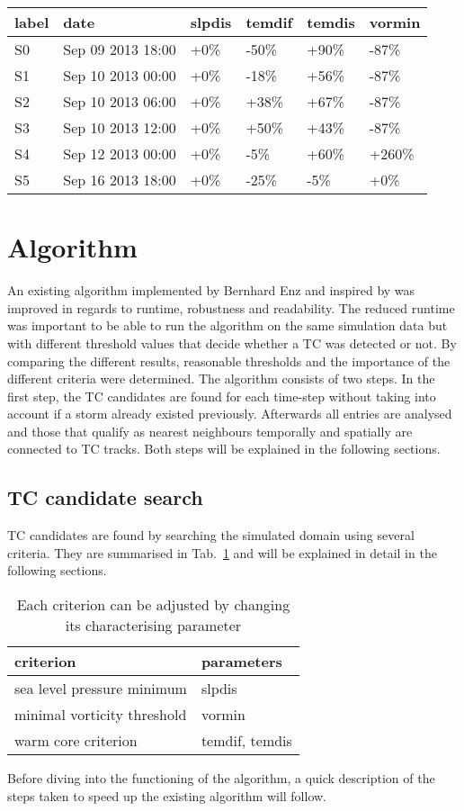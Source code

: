 \begin{tabular}{llllll}
\toprule
label &               date & slpdis & temdif & temdis & vormin \\
\midrule
   S0 &  Sep 09 2013 18:00 &    +0\% &   -50\% &   +90\% &   -87\% \\
   S1 &  Sep 10 2013 00:00 &    +0\% &   -18\% &   +56\% &   -87\% \\
   S2 &  Sep 10 2013 06:00 &    +0\% &   +38\% &   +67\% &   -87\% \\
   S3 &  Sep 10 2013 12:00 &    +0\% &   +50\% &   +43\% &   -87\% \\
   S4 &  Sep 12 2013 00:00 &    +0\% &    -5\% &   +60\% &  +260\% \\
   S5 &  Sep 16 2013 18:00 &    +0\% &   -25\% &    -5\% &    +0\% \\
\bottomrule
\end{tabular}

\section{Algorithm}
An existing algorithm implemented by Bernhard Enz and inspired by \cite{orig-tracking} was improved in regards to runtime, robustness and
readability. The reduced runtime was important to be able to run the algorithm on the
same simulation data but with different threshold values that decide whether a
TC was detected or not. By comparing the different results, reasonable thresholds
and the importance of the different criteria were determined.\newline
The algorithm consists of two steps. In the first step, the TC candidates are
found for each time-step without taking into account if a storm already existed
previously. Afterwards all entries are analysed and those that qualify as nearest neighbours temporally and spatially are connected to TC tracks. Both steps
will be explained in the following sections.
\subsection{TC candidate search}
TC candidates are found by searching the simulated domain using several
criteria. They are summarised in Tab.~\ref{tab:search-algo-summ} and will be
explained in detail in the following sections. 
\begin{table}[h]
	\centering
	\begin{tabular}{|l|l|}
		\hline
		\textbf{criterion}          & \textbf{parameters} \\ \hline
		sea level pressure minimum  & slpdis              \\
		minimal vorticity threshold & vormin              \\
		warm core criterion         & temdif, temdis      \\ \hline
	\end{tabular}
	\caption{Each criterion can be adjusted by changing its characterising
		parameter}
	\label{tab:search-algo-summ}
\end{table}
Before diving into the functioning of the algorithm, a quick description of the steps taken to speed up the existing algorithm will follow.

